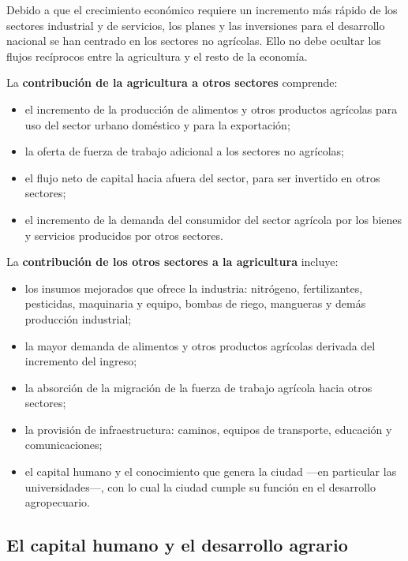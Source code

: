 \documentclass[
  man,
  floatsintext,
  longtable,
  a4paper,
  nolmodern,
  notxfonts,
  notimes,
  12pt,
  colorlinks=true,linkcolor=blue,citecolor=blue,urlcolor=blue]{apa7}
\providecommand{\tightlist}{%
  \setlength{\itemsep}{0pt}\setlength{\parskip}{0pt}}
\begin{document}
Debido a que el crecimiento económico requiere un incremento más rápido
de los sectores industrial y de servicios, los planes y las inversiones
para el desarrollo nacional se han centrado en los sectores no
agrícolas. Ello no debe ocultar los flujos recíprocos entre la
agricultura y el resto de la economía.

La \textbf{contribución de la agricultura a otros sectores} comprende:

\begin{itemize}
\tightlist
\item
  el incremento de la producción de alimentos y otros productos
  agrícolas para uso del sector urbano doméstico y para la exportación;
\item
  la oferta de fuerza de trabajo adicional a los sectores no agrícolas;
\item
  el flujo neto de capital hacia afuera del sector, para ser invertido
  en otros sectores;
\item
  el incremento de la demanda del consumidor del sector agrícola por los
  bienes y servicios producidos por otros sectores.
\end{itemize}

La \textbf{contribución de los otros sectores a la agricultura} incluye:

\begin{itemize}
\tightlist
\item
  los insumos mejorados que ofrece la industria: nitrógeno,
  fertilizantes, pesticidas, maquinaria y equipo, bombas de riego,
  mangueras y demás producción industrial;
\item
  la mayor demanda de alimentos y otros productos agrícolas derivada del
  incremento del ingreso;
\item
  la absorción de la migración de la fuerza de trabajo agrícola hacia
  otros sectores;
\item
  la provisión de infraestructura: caminos, equipos de transporte,
  educación y comunicaciones;
\item
  el capital humano y el conocimiento que genera la ciudad ---en
  particular las universidades---, con lo cual la ciudad cumple su
  función en el desarrollo agropecuario.
\end{itemize}

\subsection{El capital humano y el desarrollo
agrario}\label{el-capital-humano-y-el-desarrollo-agrario}
\end{document}
